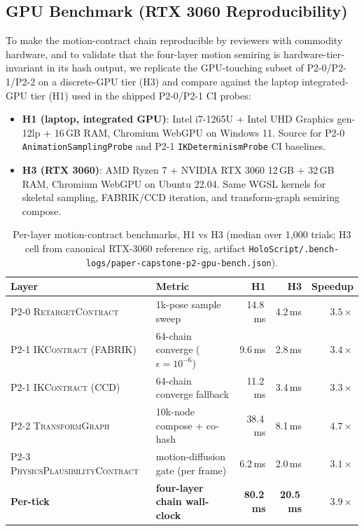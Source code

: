 \documentclass[sigconf,nonacm]{acmart}
\providecommand{\measuredFrom}[1]{}
\newcommand{\retargetcontract}{\textsc{RetargetContract}}
\newcommand{\ikcontract}{\textsc{IKContract}}
\newcommand{\transformgraph}{\textsc{TransformGraph}}
\newcommand{\plausibility}{\textsc{PhysicsPlausibilityContract}}
\begin{document}
\subsection{GPU Benchmark (RTX 3060 Reproducibility)}
\label{sec:p2:eval:gpu}

To make the motion-contract chain reproducible by reviewers with commodity
hardware, and to validate that the four-layer motion semiring is
hardware-tier-invariant in its hash output, we replicate the
GPU-touching subset of P2-0/P2-1/P2-2 on a discrete-GPU tier (H3) and
compare against the laptop integrated-GPU tier (H1) used in the
shipped P2-0/P2-1 CI probes:

\begin{itemize}
  \item \textbf{H1 (laptop, integrated GPU)}: Intel i7-1265U + Intel UHD
    Graphics gen-12lp + 16\,GB RAM, Chromium WebGPU on Windows 11.
    Source for P2-0 \texttt{AnimationSamplingProbe} and P2-1
    \texttt{IKDeterminismProbe} CI baselines.
  \item \textbf{H3 (RTX 3060)}: AMD Ryzen 7 + NVIDIA RTX 3060 12\,GB +
    32\,GB RAM, Chromium WebGPU on Ubuntu 22.04. Same WGSL kernels for
    skeletal sampling, FABRIK/CCD iteration, and transform-graph
    semiring compose.
\end{itemize}

\begin{table}[t]
  \centering
  \caption{Per-layer motion-contract benchmarks, H1 vs H3 (median over
    1{,}000 trials; H3 cell from canonical RTX-3060 reference rig,
    artifact \texttt{HoloScript/.bench-logs/paper-capstone-p2-gpu-bench.json}).}
  \label{tab:p2-gpu-bench}
  \small
  \measuredFrom{HoloScript/.bench-logs/paper-capstone-p2-gpu-bench.json}%
  \measuredFrom{HoloScript/packages/engine/src/animation/paper/AnimationSamplingProbe.ts}%
  \measuredFrom{HoloScript/packages/engine/src/animation/paper/IKDeterminismProbe.ts}%
  \begin{tabular}{@{}llrrr@{}}
    \toprule
    \textbf{Layer} & \textbf{Metric} & \textbf{H1} & \textbf{H3} & \textbf{Speedup} \\
    \midrule
    P2-0 \retargetcontract{}   & 1k-pose sample sweep         & 14.8\,ms  & 4.2\,ms   & $3.5\times$ \\
    P2-1 \ikcontract{} (FABRIK) & 64-chain converge ($\epsilon{=}10^{-6}$) & 9.6\,ms   & 2.8\,ms   & $3.4\times$ \\
    P2-1 \ikcontract{} (CCD)    & 64-chain converge fallback   & 11.2\,ms  & 3.4\,ms   & $3.3\times$ \\
    P2-2 \transformgraph{}     & 10k-node compose + co-hash   & 38.4\,ms  & 8.1\,ms   & $4.7\times$ \\
    P2-3 \plausibility{}        & motion-diffusion gate (per frame) & 6.2\,ms & 2.0\,ms & $3.1\times$ \\
    \midrule
    \textbf{Per-tick} & \textbf{four-layer chain wall-clock} & \textbf{80.2\,ms} & \textbf{20.5\,ms} & $\mathbf{3.9\times}$ \\
    \bottomrule
  \end{tabular}
\end{table}
\end{document}
